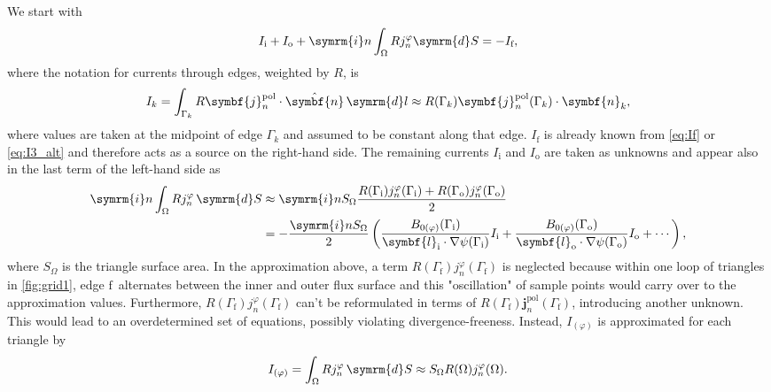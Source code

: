 \documentclass[a4paper, 10pt, english]{article}
\let\temp\varrho
\let\varrho\rho
\let\rho\temp
\let\temp\vartheta
\let\vartheta\theta
\let\theta\temp
\let\temp\varphi
\let\varphi\phi
\let\phi\temp
\let\vec\symbf
\newcommand*\diff{\ensuremath{\symrm{d}}}  %
\newcommand*\im{\ensuremath{\symrm{i}}}  %
\newcommand*\pol{\ensuremath{\textrm{pol}}}  %
\newcommand*\fs{\ensuremath{\textrm{f}}}  %
\newcommand*\inw{\ensuremath{\textrm{i}}}  %
\newcommand*\out{\ensuremath{\textrm{o}}}  %
\begin{document}
We start with
\begin{gather}
  I_{\inw} + I_{\out} + \im n \int_{\Omega} R j_{n}^{\phi} \diff S = -I_{\fs},
\end{gather}
where the notation for currents through edges, weighted by $R$, is
\begin{gather}
  I_{k} = \int_{\Gamma_{k}} R \vec{j}_{n}^{\pol} \cdot \hat{\vec{n}} \, \diff l \approx R (\Gamma_{k}) \vec{j}_{n}^{\pol} (\Gamma_{k}) \cdot \vec{n}_{k},
\end{gather}
where values are taken at the midpoint of edge $\Gamma_{k}$ and assumed to be constant along that edge. $I_{\fs}$ is already known from \cref{eq:If} or \cref{eq:I3_alt}
and therefore acts as a source on the right-hand side. The remaining currents $I_{\inw}$ and $I_{\out}$ are taken as unknowns and appear also in the last term of the left-hand side as
\begin{align}
  \im n \int_{\Omega} R j_{n}^{\phi} \, \diff S & \approx \im n S_{\Omega} \frac{R (\Gamma_{\inw}) j_{n}^{\phi} (\Gamma_{\inw}) + R (\Gamma_{\out}) j_{n}^{\phi} (\Gamma_{\out})}{2} \nonumber \\
  &= -\frac{\im n S_{\Omega}}{2} \left( \frac{B_{0 (\phi)} (\Gamma_{\inw})}{\vec{l}_{\inw} \cdot \nabla \psi (\Gamma_{\inw})} I_{\inw} + \frac{B_{0 (\phi)} (\Gamma_{\out})}{\vec{l}_{\out} \cdot \nabla \psi (\Gamma_{\out})} I_{\out} + \dotsb \right),
\end{align}
where $S_{\Omega}$ is the triangle surface area. In the approximation above, a term $R (\Gamma_{\fs}) j_{n}^{\phi} (\Gamma_{\fs})$ is neglected because within one loop of triangles in \cref{fig:grid1}, edge \fs\ alternates between the inner and outer flux surface and this "oscillation" of sample points would carry over to the approximation values. Furthermore, $R (\Gamma_{\fs}) j_{n}^{\phi} (\Gamma_{\fs})$ can't be reformulated in terms of $R (\Gamma_{\fs}) \vec{j}_{n}^{\pol} (\Gamma_{\fs})$, introducing another unknown. This would lead to an overdetermined set of equations, possibly violating divergence-freeness. Instead, $I_{(\phi)}$ is approximated for each triangle by
\begin{gather}
  I_{(\phi)} = \int_{\Omega} R j_{n}^{\phi} \, \diff S \approx S_{\Omega} R (\Omega) j_{n}^{\phi} (\Omega).
\end{gather}
\end{document}
